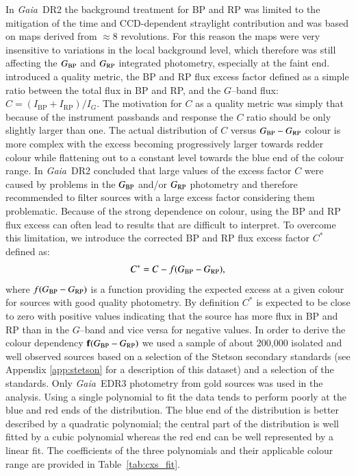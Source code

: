 \documentclass{aa}
\newcommand{\gaia}{\textit{Gaia}\xspace}
\newcommand{\gband}{$G$--band\xspace}
\newcommand{\gbp}{\ensuremath{G_{\rm BP}}\xspace}
\newcommand{\grp}{\ensuremath{G_{\rm RP}}\xspace}
\newcommand{\bprp}{\ensuremath{G_{\rm BP}-G_{\rm RP}}\xspace}
\newcommand{\cxs}{\ensuremath{C^{\ast}}\xspace}
\newcommand{\drt}{\gaia~DR2\xspace}
\newcommand{\edr}{\gaia~EDR3\xspace}
\newcommand{\xp}{BP and RP\xspace}
\newcommand{\tabref}[1]{Table~\ref{tab:#1}}
\begin{document}
In \drt the background treatment for \xp was limited to the mitigation of the time and CCD-dependent straylight contribution \citep{Proc_DR2} and was based on maps derived from $\approx8$ revolutions. For this reason the maps were very insensitive to variations in the local background level, which therefore was still affecting the \gbp and \grp integrated photometry, especially at the faint end. \cite{Phot_DR2} introduced a quality metric, the \xp flux excess factor defined as a simple ratio between the total flux in BP and RP, and the \gband flux: $C=(I_{\textrm{BP}}+I_{\textrm{RP}})/I_G$. The motivation for $C$ as a quality metric was simply that because of the instrument passbands and response the $C$ ratio should be only slightly larger than one. The actual distribution of $C$ versus \bprp colour is more complex with the excess becoming progressively larger towards redder colour while flattening out to a constant level towards the blue end of the colour range. In \drt \cite{Phot_DR2} concluded that large values of the excess factor $C$ were caused by problems in the \gbp and/or \grp photometry and therefore recommended to filter sources with a large excess factor considering them problematic.
Because of the strong dependence on colour, using the \xp flux excess can often lead to results that are difficult to interpret. To overcome this limitation, we introduce the corrected \xp flux excess factor \cxs defined as:
%
\begin{equation}\label{eq:cxs}
\cxs=C-f(\bprp),
\end{equation}
%
where $f(\bprp)$ is a function providing the expected excess at a given colour for sources with good quality photometry. By definition \cxs is expected to be close to zero with positive values indicating that the source has more flux in BP and RP than in the \gband and vice versa for negative values. In order to derive the colour dependency $\mathbf{f}(\bprp)$ we used a sample of about 200,000 isolated and well observed sources based on a selection of the Stetson secondary standards (see Appendix \ref{app:stetson} for a description of this dataset) and a selection of the \cite{Ive07} standards. Only \edr photometry from gold sources was used in the analysis. Using a single polynomial to fit the data tends to perform poorly at the blue and red ends of the distribution. The blue end of the distribution is better described by a quadratic polynomial; the central part of the distribution is well fitted by a cubic polynomial whereas the red end can be well represented by a linear fit. The coefficients of the three polynomials and their applicable colour range are provided in \tabref{cxs_fit}.
\end{document}
